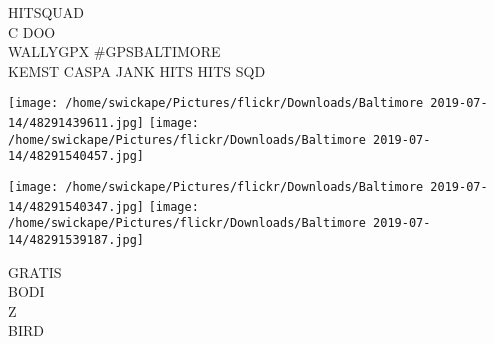 \documentclass[10pt,letterpaper]{article}
\begin{document}
HITSQUAD\\
C DOO\\
WALLYGPX \#GPSBALTIMORE\\
KEMST CASPA JANK HITS HITS SQD
\pagebreak

\texttt{[image: /home/swickape/Pictures/flickr/Downloads/Baltimore 2019-07-14/48291439611.jpg]}
\texttt{[image: /home/swickape/Pictures/flickr/Downloads/Baltimore 2019-07-14/48291540457.jpg]}

\texttt{[image: /home/swickape/Pictures/flickr/Downloads/Baltimore 2019-07-14/48291540347.jpg]}
\texttt{[image: /home/swickape/Pictures/flickr/Downloads/Baltimore 2019-07-14/48291539187.jpg]}

GRATIS\\
BODI\\
Z\\
BIRD
\pagebreak
\end{document}
